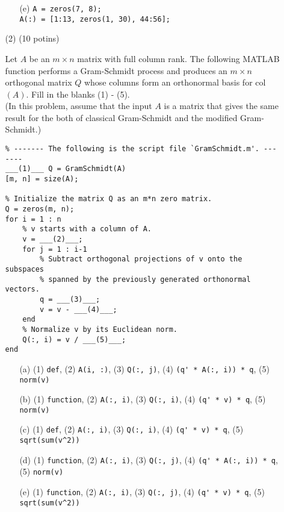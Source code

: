 \documentclass[11pt,a4paper]{article}
\begin{document}
\begin{enumerate}
\begin{enumerate}
\begin{itemize}
        \item[(e)] 
        \verb"A = zeros(7, 8);"\\
        \verb"A(:) = [1:13, zeros(1, 30), 44:56];"
    \end{itemize}

    \vspace{3mm}
    \newpage

    \item[(2)] (10 potins)
    
    \vspace{1mm}
    
    Let $A$ be an $m \times n$ matrix with full column rank. 
    The following MATLAB function performs a Gram-Schmidt process and produces 
    an $m \times n$ orthogonal matrix $Q$ whose columns form an orthonormal basis for col$(A)$. 
    Fill in the blanks (1) - (5).\\
    (In this problem, assume that the input $A$ is a matrix 
    that gives the same result for the both of classical Gram-Schmidt
     and the modified Gram-Schmidt.)

    \vspace{2mm}

    \begin{verbatim}
% ------- The following is the script file `GramSchmidt.m'. -------
___(1)___ Q = GramSchmidt(A)
[m, n] = size(A);

% Initialize the matrix Q as an m*n zero matrix.
Q = zeros(m, n);
for i = 1 : n
    % v starts with a column of A.
    v = ___(2)___;
    for j = 1 : i-1
        % Subtract orthogonal projections of v onto the subspaces
        % spanned by the previously generated orthonormal vectors.
        q = ___(3)___;
        v = v - ___(4)___;
    end
    % Normalize v by its Euclidean norm.
    Q(:, i) = v / ___(5)___;
end
    \end{verbatim}

    \begin{itemize}
        \item[(a)]
            (1) \verb"def", (2) \verb"A(i, :)", (3) \verb"Q(:, j)", (4) \verb"(q' * A(:, i)) * q", (5) \verb"norm(v)"
        \item[(b)]
            (1) \verb"function", (2) \verb"A(:, i)", (3) \verb"Q(:, i)", (4) \verb"(q' * v) * q", (5) \verb"norm(v)"
        \item[(c)]
            (1) \verb"def", (2) \verb"A(:, i)", (3) \verb"Q(:, i)", (4) \verb"(q' * v) * q", (5) \verb"sqrt(sum(v^2))"
        \item[(d)]
            (1) \verb"function", (2) \verb"A(:, i)", (3) \verb"Q(:, j)", (4) \verb"(q' * A(:, i)) * q", (5) \verb"norm(v)"
        \item[(e)]
            (1) \verb"function", (2) \verb"A(:, i)", (3) \verb"Q(:, j)", (4) \verb"(q' * v) * q", (5) \verb"sqrt(sum(v^2))"
        \end{itemize}
        
    \end{enumerate}
    
\end{enumerate}
\end{document}
